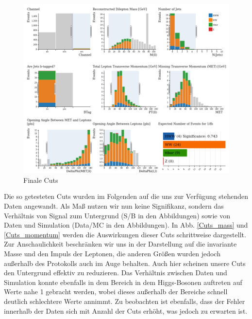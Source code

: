 \begin{figure}[h]
\includegraphics[width=\linewidth]{../Pictures/Auswertung/test_secondcuts.png}
\caption{Finale Cuts \cite{opendata}}
\label{test_secondcuts}
\end{figure}

\clearpage

Die so getesteten Cuts wurden im Folgenden auf die uns zur Verfügung stehenden Daten angewandt.
Als Maß nutzen wir nun keine Signifikanz, sondern das Verhältnis von Signal zum Untergrund (S/B in den Abbildungen) sowie von Daten und Simulation (Data/MC in den Abbildungen).
In Abb. \ref{Cuts_mass} und \ref{Cuts_momentum} werden die Auswirkungen dieser Cuts schrittweise dargestellt.
Zur Anschaulichkeit beschränken wir uns in der Darstellung auf die invariante Masse und den Impuls der Leptonen, die anderen Größen wurden jedoch außerhalb des Protokolls auch im Auge behalten.
Auch hier scheinen unsere Cuts den Untergrund effektiv zu reduzieren.
Das Verhältnis zwischen Daten und Simulation konnte ebenfalls in dem Bereich in dem Higgs-Bosonen auftreten auf Werte nahe 1 gebracht werden, wobei dieses außerhalb der Bereiche schnell deutlich schlechtere Werte annimmt.
Zu beobachten ist ebenfalls, dass der Fehler innerhalb der Daten sich mit Anzahl der Cuts erhöht, was jedoch zu erwarten ist.

